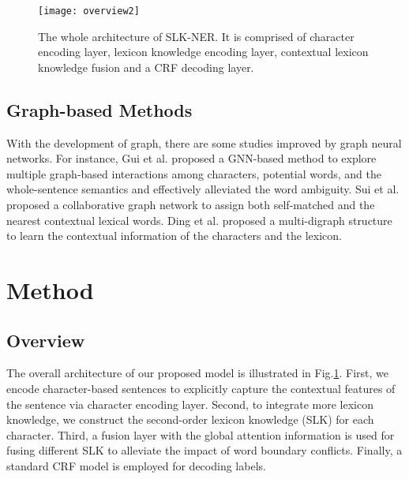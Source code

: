 \documentclass[conference]{IEEEtran}
\begin{document}
\begin{figure}[t]
    \centerline{\texttt{[image: overview2]}}
    \caption{The whole architecture of SLK-NER. 
It is comprised of character encoding layer, lexicon knowledge encoding layer, 
contextual lexicon knowledge fusion and a CRF decoding layer.
} \label{overview}
    \end{figure}


\subsection{Graph-based Methods}
With the development of graph, there are some studies improved by graph neural networks.
For instance, Gui et al. \cite{gui2019lexicon} proposed a GNN-based method to explore multiple graph-based interactions among characters, potential words,
and the whole-sentence semantics and effectively alleviated the word ambiguity.
Sui et al. \cite{sui2019leverage} proposed a collaborative graph network to assign both self-matched and the nearest contextual lexical words. 
Ding et al. \cite{ding2019neural} proposed a multi-digraph structure to learn the contextual information
of the characters and the lexicon.








\section{Method}


\subsection{Overview}


The overall architecture of our proposed model is illustrated in Fig.\ref{overview}.
First, we encode character-based sentences to explicitly capture the contextual features of the sentence via character encoding layer.
Second, to integrate more lexicon knowledge, we construct the second-order lexicon knowledge (SLK) for each character.
Third, a fusion layer with the global attention information is used for fusing different SLK 
to alleviate the impact of word boundary conflicts.
Finally, a standard CRF model \cite{lafferty2001conditional} is 
employed for decoding labels. 
\end{document}
